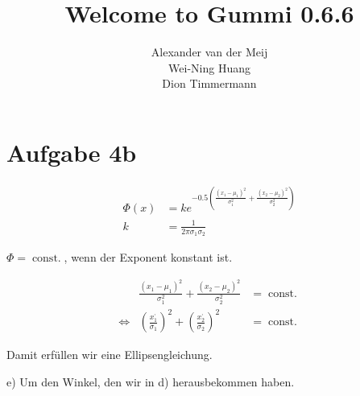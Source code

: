 \documentclass[
  bibliography=totoc,     %
  captions=tableheading,  %
  titlepage=firstiscover, %
  ngerman,
  a4paper
]{article}
\author{
  Thea Schneider%
  \texorpdfstring{
    \\
    \href{mailto:thea.schneider@udo.edu}{thea.schneider@udo.edu}
  }{}%
  \texorpdfstring{\and}{, }
  Max Pernklau%
  \texorpdfstring{
    \\
    \href{mailto:max.pernklau@udo.edu}{max.pernklau@udo.edu}
  }{}%
}
\title{\textbf{Welcome to Gummi 0.6.6}}
\author{Alexander van der Meij\\
		Wei-Ning Huang\\
		Dion Timmermann}
\date{}
\DeclareMathOperator{\const}{const.}
\begin{document}
\maketitle
































\section{Aufgabe 4b}

\begin{align}
	\Phi (x) &= k e^{-0.5 ( \frac{(x_1-\mu_1)^2}{\sigma_1^2} + \frac{(x_2-\mu_2)^2}{\sigma_2^2}) } \\
	k &= \frac{1}{2\pi \sigma_1 \sigma_2}
\end{align}

$\Phi = \const$, wenn der Exponent konstant ist.

\begin{align}
	& \frac{(x_1-\mu_1)^2}{\sigma_1^2} + \frac{(x_2-\mu_2)^2}{\sigma_2^2} &= \const \\
	\iff & (\frac{x_1^{,}}{\sigma_1})^2 + (\frac{x_2^{,}}{\sigma_2})^2 &= \const
\end{align}

Damit erfüllen wir eine Ellipsengleichung.

e) Um den Winkel, den wir in d) herausbekommen haben.
\end{document}
